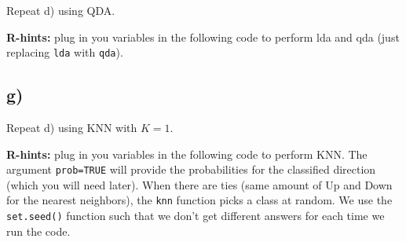 \documentclass[
]{article}
\newenvironment{Shaded}{\begin{snugshade}}{\end{snugshade}}
\newcommand{\AttributeTok}[1]{\textcolor[rgb]{0.13,0.29,0.53}{#1}}
\newcommand{\ConstantTok}[1]{\textcolor[rgb]{0.56,0.35,0.01}{#1}}
\newcommand{\DecValTok}[1]{\textcolor[rgb]{0.00,0.00,0.81}{#1}}
\newcommand{\FunctionTok}[1]{\textcolor[rgb]{0.13,0.29,0.53}{\textbf{#1}}}
\newcommand{\NormalTok}[1]{#1}
\newcommand{\OtherTok}[1]{\textcolor[rgb]{0.56,0.35,0.01}{#1}}
\newcommand{\SpecialCharTok}[1]{\textcolor[rgb]{0.81,0.36,0.00}{\textbf{#1}}}
\begin{document}
Repeat d) using QDA.

\textbf{R-hints:} plug in you variables in the following code to perform
lda and qda (just replacing \texttt{lda} with \texttt{qda}).

\begin{Shaded}
\end{Shaded}

\hypertarget{g}{%
\subsection{g)}\label{g}}

Repeat d) using KNN with \(K=1\).

\textbf{R-hints:} plug in you variables in the following code to perform
KNN. The argument \texttt{prob=TRUE} will provide the probabilities for
the classified direction (which you will need later). When there are
ties (same amount of Up and Down for the nearest neighbors), the
\texttt{knn} function picks a class at random. We use the
\texttt{set.seed()} function such that we don't get different answers
for each time we run the code.

\begin{Shaded}
\end{Shaded}
\end{document}
